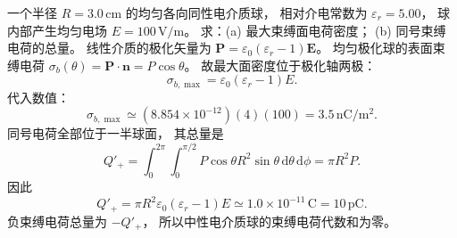 一个半径
$R=3.0\,\mathrm{cm}$ 的均匀各向同性电介质球，
相对介电常数为
$\varepsilon_r=5.00$，
球内部产生均匀电场
$E=100\,\mathrm{V/m}$。
求：(a) 最大束缚面电荷密度；
(b) 同号束缚电荷的总量。
\exsolution
线性介质的极化矢量为
$\bm P=\varepsilon_0(\varepsilon_r-1)\bm E$。
均匀极化球的表面束缚电荷
$\sigma_b(\theta)=\bm P\cdot\bm n
=P\cos\theta$。
故最大面密度位于极化轴两极：
\[
\boxed{\sigma_{b,\max}=
\varepsilon_0(\varepsilon_r-1)E}.
\]
代入数值：
\[
\boxed{\sigma_{b,\max}\simeq
(8.854\times10^{-12})(4)(100)
=3.5\,\mathrm{nC/m^2}}.
\]
同号电荷全部位于一半球面，
其总量是
\[
Q'_+=\int_0^{2\pi}\int_0^{\pi/2}
P\cos\theta R^2\sin\theta
\,\mathrm d\theta\,\mathrm d\phi
=\pi R^2P.
\]
因此
\[
\boxed{Q'_+=\pi R^2
\varepsilon_0(\varepsilon_r-1)E
\simeq1.0\times10^{-11}\,\mathrm C
=10\,\mathrm{pC}}.
\]
\excheck 负束缚电荷总量为 $-Q'_+$，
所以中性电介质球的束缚电荷代数和为零。
